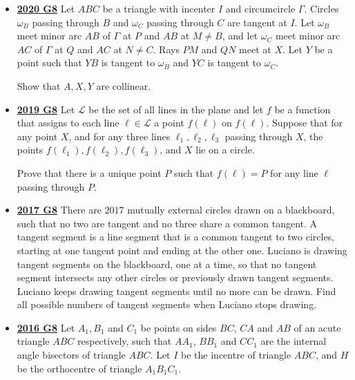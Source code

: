 \documentclass[11pt]{scrartcl}
\begin{document}
\begin{itemize}[leftmargin=*]
Prove that $\overline{AR} \perp \overline{BC}$.
\item \href{https://artofproblemsolving.com/community/c6h2625877p22698191}{\textbf{2020 G8}} Let $ABC$ be a triangle with incenter $I$ and circumcircle $\Gamma$. Circles $\omega_{B}$ passing through $B$ and $\omega_{C}$ passing through $C$ are tangent at $I$. Let $\omega_{B}$ meet minor arc $AB$ of $\Gamma$ at $P$ and $AB$ at $M\neq B$, and let $\omega_{C}$ meet minor arc $AC$ of $\Gamma$ at $Q$ and $AC$ at $N\neq C$. Rays $PM$ and $QN$ meet at $X$. Let $Y$ be a point such that $YB$ is tangent to $\omega_{B}$ and $YC$ is tangent to $\omega_{C}$. 

Show that $A,X,Y$ are collinear.
\item \href{https://artofproblemsolving.com/community/c6h2278995p17828714}{\textbf{2019 G8}} 	Let $\mathcal L$ be the set of all lines in the plane and let $f$ be a function that assigns to each line $\ell\in\mathcal L$ a point $f(\ell)$ on $f(\ell)$. Suppose that for any point $X$, and for any three lines $\ell_1,\ell_2,\ell_3$ passing through $X$, the points $f(\ell_1),f(\ell_2),f(\ell_3)$, and $X$ lie on a circle.

Prove that there is a unique point $P$ such that $f(\ell)=P$ for any line $\ell$ passing through $P$.

\newpage

\item \href{https://artofproblemsolving.com/community/c6h1671302p10632384}{\textbf{2017 G8}} There are $2017$ mutually external circles drawn on a blackboard, such that no two are tangent and no three share a common tangent. A tangent segment is a line segment that is a common tangent to two circles, starting at one tangent point and ending at the other one. Luciano is drawing tangent segments on the blackboard, one at a time, so that no tangent segment intersects any other circles or previously drawn tangent segments. Luciano keeps drawing tangent segments until no more can be drawn. Find all possible numbers of tangent segments when Luciano stops drawing.
\item \href{https://artofproblemsolving.com/community/c6h1480722p8639326}{\textbf{2016 G8}} Let $A_1, B_1$ and $C_1$ be points on sides $BC$, $CA$ and $AB$ of an acute triangle $ABC$ respectively, such that $AA_1$, $BB_1$ and $CC_1$ are the internal angle bisectors of triangle $ABC$. Let $I$ be the incentre of triangle $ABC$, and $H$ be the orthocentre of triangle $A_1B_1C_1$. 


\end{itemize}
\end{document}

